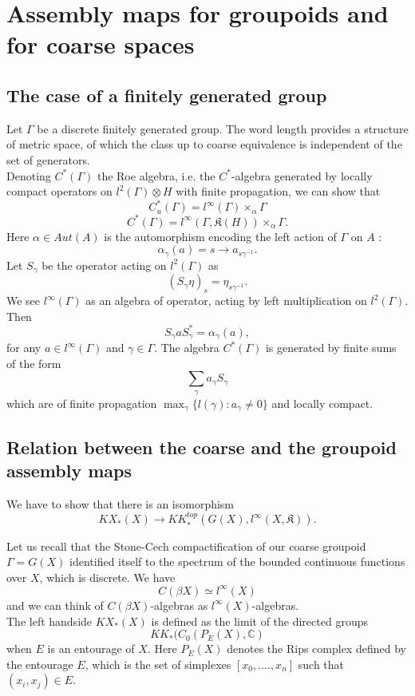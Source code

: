 \section{Assembly maps for groupoids and for coarse spaces}

\subsection{The case of a finitely generated group}
Let $\Gamma$ be a discrete finitely generated group. The word length provides a structure of metric space, of which the class up to coarse equivalence is independent of the set of generators.\\

Denoting $C^*(\Gamma)$ the Roe algebra, i.e. the $C^*$-algebra generated by locally compact operators on $l^2(\Gamma)\otimes H$ with finite propagation, we can show that 
\[C_u^*(\Gamma) = l^\infty (\Gamma) \times_\alpha \Gamma\]
\[C^*(\Gamma) = l^\infty (\Gamma,\mathfrak K (H)) \times_\alpha \Gamma.\]
Here $\alpha \in Aut(A)$ is the automorphism encoding the left action of $\Gamma$ on $A$ :
\[\alpha_\gamma ( a ) = s\rightarrow a_{s\gamma^{-1}}.\]
Let $S_\gamma$ be the operator acting on $l^2(\Gamma)$ as 
\[(S_\gamma \eta)_s=\eta_{s\gamma^{-1}}.\]
We see $l^\infty (\Gamma)$ as an algebra of operator, acting by left multiplication on $l^2(\Gamma)$. Then 
\[S_\gamma aS_\gamma^* = \alpha_\gamma(a),\]
for any $a\in l^\infty(\Gamma)$ and $\gamma\in\Gamma$. The algebra $C^*(\Gamma)$ is generated by finite sums of the form
\[\sum_\gamma a_\gamma S_{\gamma}\]
which are of finite propagation $\max_\gamma \{l(\gamma) : a_\gamma\neq 0\}$ and locally compact.  

\subsection{Relation between the coarse and the groupoid assembly maps}

We have to show that there is an isomorphism 
\[KX_*(X)\rightarrow KK^{top}_*(G(X),l^\infty (X, \mathfrak K)).\]

Let us recall that the Stone-Cech compactification of our coarse groupoid $\Gamma=G(X)$ identified itself to the spectrum of the bounded continuous functions over $X$, which is discrete. We have
\[C(\beta X)\simeq l^\infty(X)\]
and we can think of $C(\beta X)$-algebras as $l^\infty (X)$-algebras.\\

The left handside $KX_*(X)$ is defined as the limit of the directed groups 
\[KK_*(C_0(P_E(X),\mathbb C)\]
when $E$ is an entourage of $X$. Here $P_E(X)$ denotes the Rips complex defined by the entourage $E$, which is the set of simplexes $[x_0,....,x_n]$ such that $(x_i,x_j)\in E$.\\

